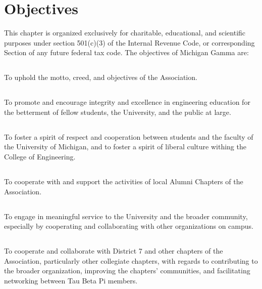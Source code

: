 \chapter{Objectives}\label{sec:objectives}

This chapter is organized exclusively for charitable, educational, and scientific purposes under section 501(c)(3) of the Internal Revenue Code, or corresponding Section of any future federal tax code.
The objectives of Michigan Gamma are:

\section{}
To uphold the motto, creed, and objectives of the Association.

\section{}
To promote and encourage integrity and excellence in engineering education for the betterment of fellow students, the University, and the public at large.

\section{}
To foster a spirit of respect and cooperation between students and the faculty of the University of Michigan, and to foster a spirit of liberal culture withing the College of Engineering.

\section{}
To cooperate with and support the activities of local Alumni Chapters of the Association.

\section{}
To engage in meaningful service to the University and the broader community, especially by cooperating and collaborating with other organizations on campus.

\section{}
To cooperate and collaborate with District 7 and other chapters of the Association, particularly other collegiate chapters, with regards to contributing to the broader organization, improving the chapters' communities, and facilitating networking between Tau Beta Pi members.

